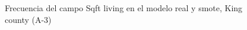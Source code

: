 \begin{figure}[H]
    \centering
    
    \caption{Frecuencia del campo Sqft living en el modelo real y smote, King county (A-3)}
    \label{frecuency-smote-sqft living}
\end{figure}